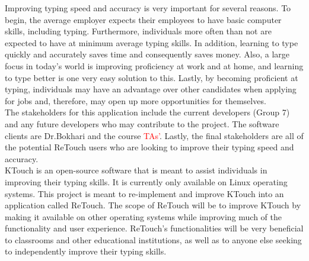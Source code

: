 \documentclass[12pt, oneside]{article}
\begin{document}
Improving typing speed and accuracy is very important for several reasons. To begin, the average employer expects their employees to have basic computer skills, including typing. Furthermore, individuals more often than not are expected to have at minimum average typing skills. In addition, learning to type quickly and accurately saves time and consequently saves money. Also, a large focus in today's world is improving proficiency at work and at home, and learning to type better is one very easy solution to this. Lastly, by becoming proficient at typing, individuals may have an advantage over other candidates when applying for jobs and, therefore, may open up more opportunities for themselves.
\\


The stakeholders for this application include the current developers (Group 7) and any future developers who may contribute to the project. The software clients are Dr.Bokhari and the course \textcolor{red}{TAs'}. Lastly, the final stakeholders are all of the potential ReTouch users who are looking to improve their typing speed and accuracy. 
\\

KTouch is an open-source software that is meant to assist individuals in improving their typing skills. It is currently only available on Linux operating systems. This project is meant to re-implement and improve KTouch into an application called ReTouch. The scope of ReTouch will be to improve KTouch by making it available on other operating systems while improving much of the functionality and user experience. ReTouch's functionalities will be very beneficial to classrooms and other educational institutions, as well as to anyone else seeking to independently improve their typing skills.
\end{document}
